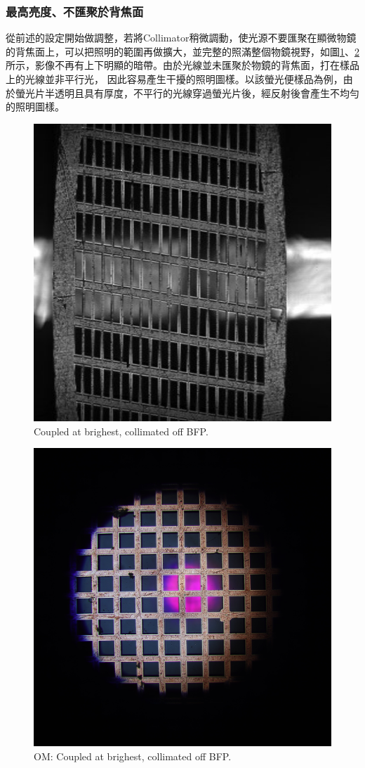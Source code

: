 \documentclass[12pt]{article}
\begin{document}
    \subsubsection{最高亮度、不匯聚於背焦面}
    從前述的設定開始做調整，若將Collimator稍微調動，使光源不要匯聚在顯微物鏡的背焦面上，可以把照明的範圍再做擴大，並完整的照滿整個物鏡視野，如圖\ref{figure: brightest_off}、\ref{figure: om_brightest_off}所示，影像不再有上下明顯的暗帶。由於光線並未匯聚於物鏡的背焦面，打在樣品上的光線並非平行光，
    因此容易產生干擾的照明圖樣。以該螢光便樣品為例，由於螢光片半透明且具有厚度，不平行的光線穿過螢光片後，經反射後會產生不均勻的照明圖樣。
    \begin{figure}
        \centering
        \includegraphics[width=0.5\linewidth]{off_brightest.jpg}
        \caption{Coupled at brighest, collimated off BFP.}
        \label{figure: brightest_off}
    \end{figure}
    \begin{figure}
        \centering
        \includegraphics[width=0.5\linewidth]{om_off_brighest.JPG}
        \caption{OM: Coupled at brighest, collimated off BFP.}
        \label{figure: om_brightest_off}
    \end{figure}
\end{document}

